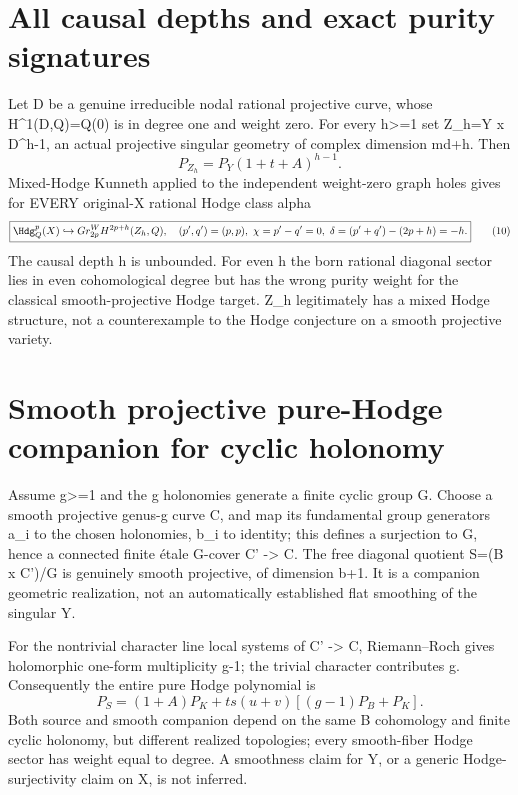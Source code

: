 \documentclass[11pt]{article}
\begin{document}
\section{All causal depths and exact purity signatures}
Let D be a genuine irreducible nodal rational projective curve, whose H^1(D,Q)=Q(0) is in degree one and weight zero. For every h>=1 set
Z_h=Y x D^{h-1}, an actual projective singular geometry of complex dimension md+h. Then
\[
\boxed{P_{Z_h}=P_Y(1+t+A)^{h-1}.}\tag{9}
\]
Mixed-Hodge Kunneth applied to the independent weight-zero graph holes gives for EVERY original-X rational Hodge class alpha
\[
\boxed{\Hdg^p_Q(X)\hookrightarrow
Gr^W_{2p}H^{2p+h}(Z_h,Q),\quad
(p',q')=(p,p),\ \chi=p'-q'=0,\ \delta=(p'+q')-(2p+h)=-h.}
\tag{10}
\]
The causal depth h is unbounded. For even h the born rational diagonal sector lies in even cohomological degree but has the wrong purity weight for the classical smooth-projective Hodge target. Z_h legitimately has a mixed Hodge structure, not a counterexample to the Hodge conjecture on a smooth projective variety.

\section{Smooth projective pure-Hodge companion for cyclic holonomy}
Assume g>=1 and the g holonomies generate a finite cyclic group G. Choose a smooth projective genus-g curve C, and map its fundamental group generators a_i to the chosen holonomies, b_i to identity; this defines a surjection to G, hence a connected finite étale G-cover C' -> C. The free diagonal quotient S=(B x C')/G is genuinely smooth projective, of dimension b+1. It is a companion geometric realization, not an automatically established flat smoothing of the singular Y.

For the nontrivial character line local systems of C' -> C, Riemann--Roch gives holomorphic one-form multiplicity g-1; the trivial character contributes g. Consequently the entire pure Hodge polynomial is
\[
\boxed{P_S=(1+A)P_K+ts(u+v)[(g-1)P_B+P_K].}\tag{11}
\]
Both source and smooth companion depend on the same B cohomology and finite cyclic holonomy, but different realized topologies; every smooth-fiber Hodge sector has weight equal to degree. A smoothness claim for Y, or a generic Hodge-surjectivity claim on X, is not inferred.
\end{document}
